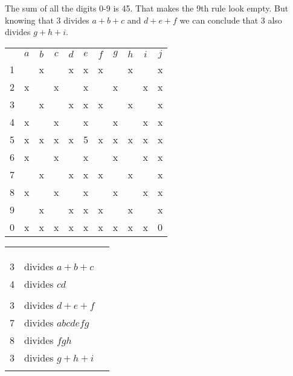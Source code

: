 The sum of all the digits 0-9 is 45.  That makes the 9th rule look empty.  But knowing that 3 divides $a+b+c$ and $d+e+f$ we can conclude that 3 also divides $g+h+i$.
\begin{center}
\begin{tabular}{ccccccccccc}
			&	$a$	&	$b$	&	$c$	&	$d$	&	$e$	&	$f$	&	$g$	&	$h$	&	$i$	&	$j$	\\
	1		&		&	x	&		&	x	&	x	&	x	&		&	x	&		&	x	\\
	2		&	x	&		&	x	&		&	x	&		&	x	&		&	x	&	x	\\
	3		&		&	x	&		&	x	&	x	&	x	&		&	x	&		&	x	\\
	4		&	x	&		&	x	&		&	x	&		&	x	&		&	x	&	x	\\
	5		&	x	&	x	&	x	&	x	&	5	&	x	&	x	&	x	&	x	&	x	\\
	6		&	x	&		&	x	&		&	x	&		&	x	&		&	x	&	x	\\
	7		&		&	x	&		&	x	&	x	&	x	&		&	x	&		&	x	\\
	8		&	x	&		&	x	&		&	x	&		&	x	&		&	x	&	x	\\
	9		&		&	x	&		&	x	&	x	&	x	&		&	x	&		&	x	\\
	0		&	x	&	x	&	x	&	x	&	x	&	x	&	x	&	x	&	x	&	0	\\
\end{tabular}
\hspace{1cm}\vline\hspace{1cm}
\begin{tabular}{rll}
	& 		\\
	& 		\\
	& 		\\
	3	&	divides $a+b+c$					\\
	4	&	divides $cd$					\\
		&	\\
	3	&	divides $d+e+f$					\\
	7	&	divides $abcdefg$				\\
	8	&	divides $fgh$					\\
	3	&	divides $g+h+i$					\\
		&	
\end{tabular}
\end{center}

